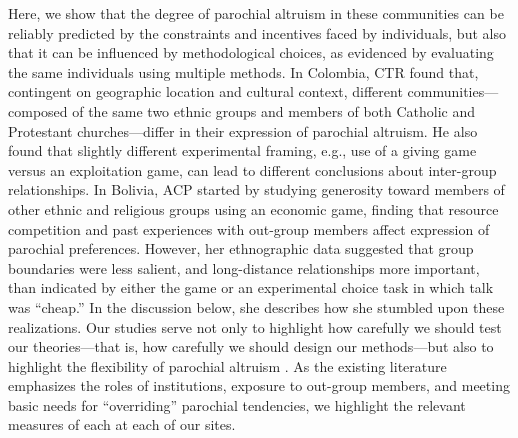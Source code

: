 \documentclass[bibauthoryear]{aa}
\begin{document}
Here, we show that the degree of parochial altruism in these communities can be reliably predicted by the constraints and incentives faced by individuals, but also that it can be influenced by methodological choices, as evidenced by evaluating the same individuals using multiple methods. In Colombia, CTR found that, contingent on  geographic location and cultural context, different communities---composed of the same two ethnic groups and members of both Catholic and Protestant churches---differ in their expression of parochial altruism. He also found that slightly different experimental framing, e.g., use of a giving game versus an exploitation game, can lead to different conclusions about inter-group relationships. In Bolivia, ACP started by studying generosity toward members of other ethnic and religious groups using an economic game, finding that resource competition and past experiences with out-group members affect expression of parochial preferences. However, her ethnographic data suggested that group boundaries were less salient, and long-distance relationships more important, than indicated by either the game or an experimental choice task in which talk was ``cheap.'' In the discussion below, she describes how she stumbled upon these realizations. Our studies serve not only to highlight how carefully we should test our theories---that is, how carefully we should design our methods---but also to highlight the flexibility of parochial altruism \citep[e.g.,][] {brewer1976ethnocentrism}. As the existing literature emphasizes the roles of institutions, exposure to out-group members, and meeting basic needs for ``overriding'' parochial tendencies, we highlight the relevant measures of each at each of our sites. %
\end{document}
